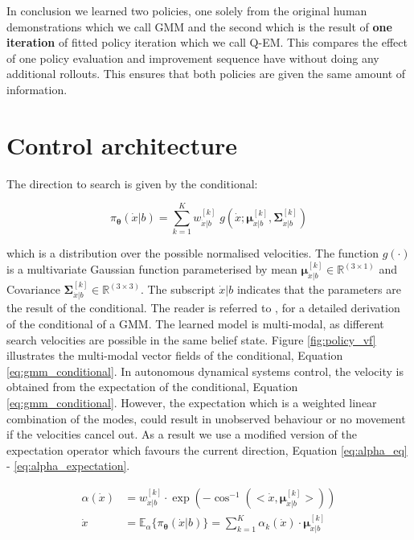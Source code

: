 \documentclass[final,5p,times,twocolumn]{elsarticle}
\newcommand{\SigK}{\boldsymbol{\Sigma}^{[k]}}
\newcommand{\MuK}{\boldsymbol{\mu}^{[k]}}
\newcommand{\xb}{\dot{x}|b}
\newcommand{\Param}{\boldsymbol{\theta}}
\begin{document}
In conclusion we learned two policies, one solely from the original human demonstrations which we call GMM and the second which 
is the result of \textbf{one iteration} of fitted policy iteration which we call Q-EM. This compares the effect
of one policy evaluation and improvement sequence have without doing any additional rollouts. This ensures that both policies
are given the same amount of information.

\section{Control architecture}\label{sec:control_architecture}

The direction to search is given by the conditional:

\begin{equation}\label{eq:gmm_conditional}
 \pi_{\Param}(\dot{x}|b) = \sum_{k=1}^{K} w^{[k]}_{\xb} \; g(\dot{x};\MuK_{\xb},\SigK_{\xb}) 
 \end{equation}

which is a distribution over the possible normalised velocities. The function $g(\cdot)$ is a multivariate
Gaussian function parameterised by mean $\MuK_{\xb} \in \mathbb{R}^{(3\times1)}$ and Covariance $\SigK_{\xb} \in \mathbb{R}^{(3\times3)}$. The subscript $\xb$ indicates that the parameters 
are the result of the conditional. The reader is referred to \cite{gesture_calinon_2010}, \cite{gmr_2004} for 
a detailed derivation of the conditional of a GMM. The learned model 
is multi-modal, as different search velocities are possible 
in the same belief state. Figure \ref{fig:policy_vf} illustrates the multi-modal 
vector fields of the conditional, Equation \ref{eq:gmm_conditional}.
In autonomous dynamical systems control, the velocity is obtained from 
the expectation of the conditional, Equation \ref{eq:gmm_conditional}. However, the expectation which is a weighted 
linear combination of the modes, could result in unobserved behaviour or no movement if the velocities cancel out. 
As a result we use a modified version of the expectation operator which favours the current
direction, Equation \ref{eq:alpha_eq} - \ref{eq:alpha_expectation}.

\begin{align}
 \alpha(\dot{x}) &= w^{[k]}_{\xb} \cdot \exp(-\cos^{-1}(<\dot{x},\MuK_{\xb}>)) \label{eq:alpha_eq}\\
 \dot{x} &= \mathbb{E}_{\alpha}\{\pi_{\Param}(\dot{x}|b)\} = \sum_{k=1}^K \alpha_k(\dot{x}) \cdot \MuK_{\xb} \label{eq:alpha_expectation}
\end{align}
\end{document}

